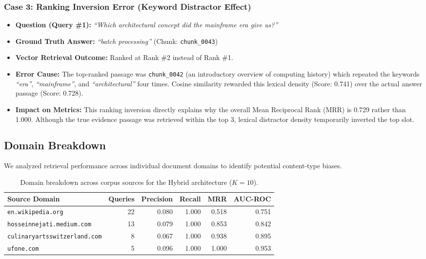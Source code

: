 \documentclass[11pt,a4paper]{article}
\begin{document}
\subsubsection{Case 3: Ranking Inversion Error (Keyword Distractor Effect)}
\begin{itemize}[nosep]
  \item \textbf{Question (Query \#1):} \textit{``Which architectural concept did the mainframe era give us?''}
  \item \textbf{Ground Truth Answer:} \textit{``batch processing''} (Chunk: \texttt{chunk\_0043})
  \item \textbf{Vector Retrieval Outcome:} Ranked at Rank \#2 instead of Rank \#1.
  \item \textbf{Error Cause:} The top-ranked passage was \texttt{chunk\_0042} (an introductory overview of computing history) which repeated the keywords \textit{``era''}, \textit{``mainframe''}, and \textit{``architectural''} four times. Cosine similarity rewarded this lexical density (Score: 0.741) over the actual answer passage (Score: 0.728).
  \item \textbf{Impact on Metrics:} This ranking inversion directly explains why the overall Mean Reciprocal Rank (MRR) is 0.729 rather than 1.000. Although the true evidence passage was retrieved within the top 3, lexical distractor density temporarily inverted the top slot.
\end{itemize}

\subsection{Domain Breakdown}
We analyzed retrieval performance across individual document domains to identify potential content-type biases.

\begin{table}[H]
\centering
\caption{Domain breakdown across corpus sources for the Hybrid architecture ($K=10$).}
\begin{tabular}{lrrrrr}
\toprule
\textbf{Source Domain} & \textbf{Queries} & \textbf{Precision} & \textbf{Recall} & \textbf{MRR} & \textbf{AUC-ROC} \\
\midrule
\texttt{en.wikipedia.org} & 22 & 0.080 & 1.000 & 0.518 & 0.751 \\
\texttt{hosseinnejati.medium.com} & 13 & 0.079 & 1.000 & 0.853 & 0.842 \\
\texttt{culinaryartsswitzerland.com} & 8 & 0.067 & 1.000 & 0.938 & 0.895 \\
\texttt{ufone.com} & 5 & 0.096 & 1.000 & 1.000 & 0.953 \\
\bottomrule
\end{tabular}
\end{table}
\end{document}
